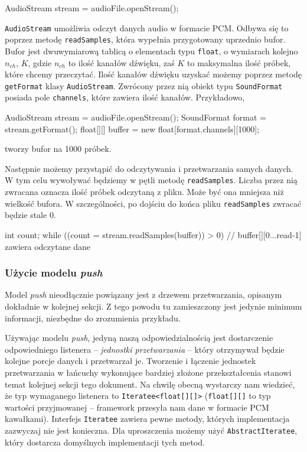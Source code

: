 \begin{java}
AudioStream stream = audioFile.openStream();
\end{java}

\texttt{AudioStream} umożliwia odczyt danych audio w formacie PCM. Odbywa się to poprzez metodę
\texttt{readSamples}, która wypełnia przygotowany uprzednio bufor. Bufor jest dwuwymiarową tablicą o
elementach typu \texttt{float}, o wymiarach kolejno $n_{ch}$, $K$, gdzie $n_{ch}$ to ilość kanałów
dźwięku, zaś $K$ to maksymalna ilość próbek, które chcemy przeczytać. Ilość kanałów dźwięku
uzyskać możemy poprzez metodę \texttt{getFormat} klasy \texttt{AudioStream}.  Zwrócony przez nią
obiekt typu \texttt{SoundFormat} posiada pole \texttt{channels}, które zawiera ilość kanałów.
Przykładowo,

\begin{java}
AudioStream stream = audioFile.openStream();
SoundFormat format = stream.getFormat();
float[][] buffer = new float[format.channels][1000];
\end{java}

tworzy bufor na 1000 próbek.

Następnie możemy przystąpić do odczytywania i przetwarzania samych danych. W tym celu wywoływać
będziemy w pętli metodę \texttt{readSamples}. Liczba przez nią zwracana oznacza ilość próbek odczytaną z
pliku. Może być ona mniejsza niż wielkość bufora. W szczególności, po dojściu do końca pliku
\texttt{readSamples} zwracać będzie stale 0.

\begin{java}
int count;
while ((count = stream.readSamples(buffer)) > 0) {
    // buffer[][0...read-1] zawiera odczytane dane
}
\end{java}

\subsubsection{Użycie modelu \emph{push}}

\begin{Note}
Model \emph{push} nieodłącznie powiązany jest z drzewem przetwarzania, opisanym dokładnie w kolejnej
sekcji. Z tego powodu tu zamieszczony jest jedynie minimum informacji, niezbędne do zrozumienia
przykładu.
\end{Note}

Używając modelu \emph{push}, jedyną naszą odpowiedzialnością jest dostarczenie odpowiedniego
listenera -- \emph{jednostki przetwarzania} -- który otrzymywał będzie kolejne porcje danych i
przetwarzał je.  Tworzenie i łączenie jednostek przetwarzania w łańcuchy wykonujące bardziej złożone
przekształcenia stanowi temat kolejnej sekcji tego dokument. Na chwilę obecną wystarczy nam
wiedzieć, że typ wymaganego listenera to \texttt{Iteratee<float[][]>} (\texttt{float[][]} to typ
wartości przyjmowanej -- framework przesyła nam dane w formacie PCM kawałkami). Interfejs
\texttt{Iteratee} zawiera pewne metody, których implementacja zazwyczaj nie jest konieczna. Dla
uproszczenia możemy użyć \texttt{AbstractIteratee}, który dostarcza domyślnych implementacji tych
metod.

